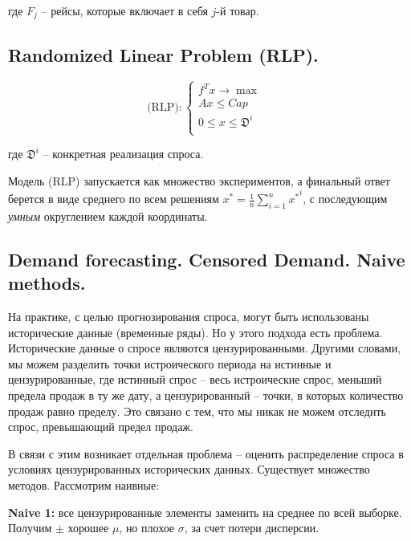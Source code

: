 \documentclass[reqno]{article}
\theoremstyle{definition}
\theoremstyle{definition}
\theoremstyle{definition}
\theoremstyle{definition}
\theoremstyle{definition}
\theoremstyle{definition}
\theoremstyle{definition}
\theoremstyle{definition}
\theoremstyle{definition}
\begin{document}
		где $F_j$ -- рейсы, которые включает в себя $j$-й товар.
		
		\subsection{Randomized Linear Problem (RLP).}
		
		$$
		\text{(RLP)}:
		\begin{cases}
			f^Tx \rightarrow \max & \\
			Ax \leq Cap & \\
			0 \leq x \leq \mathfrak{D}^i & \\
		\end{cases}	
		$$
		
		где $\mathfrak{D}^i$ -- конкретная реализация спроса.
		
		Модель (RLP) запускается как множество экспериментов, а финальный ответ берется в виде среднего по всем решениям $x^* = \frac{1}{n}\sum\limits^n_{i = 1} {x^*}^i$, с последующим \textit{умным} округлением каждой координаты.
		
		
		\subsection{Demand forecasting. Censored Demand. Naive methods.}
		
		На практике, с целью прогнозирования спроса, могут быть использованы исторические данные (временные ряды). Но у этого подхода есть проблема. Исторические данные о спросе являются цензурированными. Другими словами, мы можем разделить точки истроического периода на истинные и цензурированные, где истинный спрос -- весь истроические спрос, меньший предела продаж в ту же дату, а цензурированный -- точки, в которых количество продаж равно пределу. Это связано с тем, что мы никак не можем отследить спрос, превышающий предел продаж.
		
		В связи с этим возникает отдельная проблема -- оценить распределение спроса в условиях цензурированных исторических данных. Существует множество методов. Рассмотрим наивные:
		
		\textbf{Naive 1:} все цензурированные элементы заменить на среднее по всей выборке. Получим $\pm$ хорошее $\mu$, но плохое $\sigma$, за счет потери дисперсии.
		
		
		
		
\end{document}
